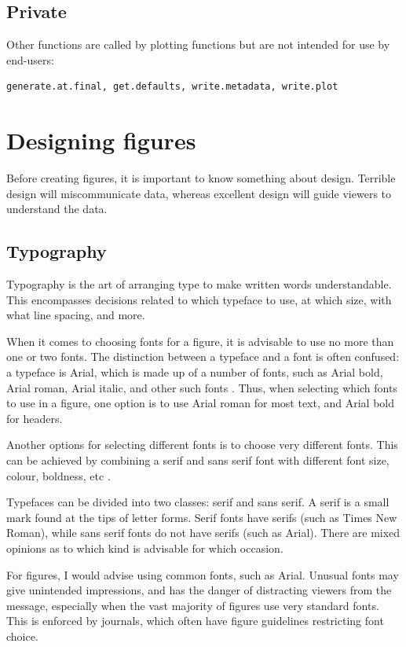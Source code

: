 \documentclass[letterpaper]{article}
\begin{document}
\subsection{Private}
Other functions are called by plotting functions but are not intended for use by end-users: 
\begin{verbatim}
generate.at.final, get.defaults, write.metadata, write.plot
\end{verbatim}

\section{Designing figures}
Before creating figures, it is important to know something about design. Terrible design will miscommunicate data, whereas excellent design will guide viewers to understand the data\cite{tufte}. 

\subsection{Typography}
Typography is the art of arranging type to make written words understandable. This encompasses decisions related to which typeface to use, at which size, with what line spacing, and more. 

When it comes to choosing fonts for a figure, it is advisable to use no more than one or two fonts. The distinction between a typeface and a font is often confused: a typeface is Arial, which is made up of a number of fonts, such as Arial bold, Arial roman, Arial italic, and other such fonts \cite{wong-type}. Thus, when selecting which fonts to use in a figure, one option is to use Arial roman for most text, and Arial bold for headers.

Another options for selecting different fonts is to choose very different fonts. This can be achieved by combining a serif and sans serif font with different font size, colour, boldness, etc \cite{williams}.

Typefaces can be divided into two classes: serif and \textsf{sans serif}. A serif is a small mark found at the tips of letter forms. Serif fonts have serifs (such as Times New Roman), while \textsf{sans serif} fonts do not have serifs (such as Arial). There are mixed opinions as to which kind is advisable for which occasion.

For figures, I would advise using common fonts, such as Arial. Unusual fonts may give unintended impressions, and has the danger of distracting viewers from the message, especially when the vast majority of figures use very standard fonts. This is enforced by journals, which often have figure guidelines restricting font choice. 
\end{document}
